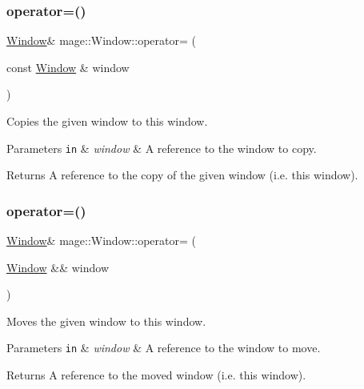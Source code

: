 \subsubsection{\texorpdfstring{operator=()}{operator=()}\hspace{0.1cm}{\footnotesize\ttfamily [1/2]}}
{\footnotesize\ttfamily \mbox{\hyperlink{classmage_1_1_window}{Window}}\& mage\+::\+Window\+::operator= (\begin{DoxyParamCaption}\item[{const \mbox{\hyperlink{classmage_1_1_window}{Window}} \&}]{window }\end{DoxyParamCaption})\hspace{0.3cm}{\ttfamily [delete]}}

Copies the given window to this window.


\begin{DoxyParams}[1]{Parameters}
\mbox{\tt in}  & {\em window} & A reference to the window to copy. \\
\hline
\end{DoxyParams}
\begin{DoxyReturn}{Returns}
A reference to the copy of the given window (i.\+e. this window). 
\end{DoxyReturn}
\mbox{\label{classmage_1_1_window_aa52284540a75c98a2aa768a5d6410378}} 
\subsubsection{\texorpdfstring{operator=()}{operator=()}\hspace{0.1cm}{\footnotesize\ttfamily [2/2]}}
{\footnotesize\ttfamily \mbox{\hyperlink{classmage_1_1_window}{Window}}\& mage\+::\+Window\+::operator= (\begin{DoxyParamCaption}\item[{\mbox{\hyperlink{classmage_1_1_window}{Window}} \&\&}]{window }\end{DoxyParamCaption})\hspace{0.3cm}{\ttfamily [delete]}}

Moves the given window to this window.


\begin{DoxyParams}[1]{Parameters}
\mbox{\tt in}  & {\em window} & A reference to the window to move. \\
\hline
\end{DoxyParams}
\begin{DoxyReturn}{Returns}
A reference to the moved window (i.\+e. this window). 
\end{DoxyReturn}
\mbox{\label{classmage_1_1_window_a9b1efac3d0bd27df4e33ab704bc59f98}} 
